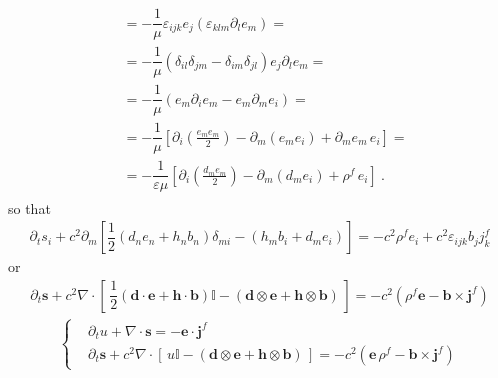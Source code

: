 \documentclass[letterpaper,10pt,italian]{jupyterBook}
\begin{document}
\begin{equation*}
\begin{split}
\begin{aligned}
  & = - \dfrac{1}{\mu} \varepsilon_{ijk} e_j \left( \varepsilon_{klm} \partial_l e_m \right) = \\
  & = - \dfrac{1}{\mu} \left( \delta_{il} \delta_{jm} - \delta_{im} \delta_{jl} \right) e_j \partial_l e_m =  \\
  & = - \dfrac{1}{\mu} \left( e_m \partial_i e_m - e_m \partial_m e_i \right) =  \\
  & = - \dfrac{1}{\mu} \left[ \partial_i \left(\frac{e_m e_m}{2}\right) -  \partial_m \left( e_m e_i \right) + \partial_m e_m \, e_i \right] = \\
  & = - \dfrac{1}{\varepsilon \mu} \left[ \partial_i \left(\frac{d_m e_m}{2}\right) - \partial_m \left( d_m e_i \right) + \rho^f \, e_i \right] \ .
\end{aligned}\end{split}
\end{equation*}
\sphinxAtStartPar
so that
\begin{equation*}
\begin{split}\partial_t s_i + c^2 \partial_m \left[ \dfrac{1}{2}\left( d_n e_n + h_n b_n \right) \delta_{mi} - \left( h_m b_i + d_m e_i \right) \right] = - c^2 \rho^f e_i + c^2 \varepsilon_{ijk} b_j j_k^f \end{split}
\end{equation*}
\sphinxAtStartPar
or
\begin{equation*}
\begin{split}\partial_t \mathbf{s} + c^2 \nabla \cdot \left[ \, \dfrac{1}{2} \left( \mathbf{d} \cdot \mathbf{e} + \mathbf{h} \cdot \mathbf{b} \right) \mathbb{I} - \left( \mathbf{d} \otimes \mathbf{e} + \mathbf{h} \otimes \mathbf{b} \right) \, \right] = - c^2 \left( \rho^f \mathbf{e} - \mathbf{b} \times \mathbf{j}^f \right)\end{split}
\end{equation*}\begin{equation*}
\begin{split}\begin{cases}
& \partial_t u + \nabla \cdot \mathbf{s} = - \mathbf{e} \cdot \mathbf{j}^f \\
& \partial_t \mathbf{s} + c^2 \nabla \cdot \left[ \, u \mathbb{I} - \left( \mathbf{d} \otimes \mathbf{e} + \mathbf{h} \otimes \mathbf{b} \right) \, \right] = - c^2 \left( \mathbf{e} \, \rho^f - \mathbf{b} \times \mathbf{j}^f \right)
\end{cases}\end{split}
\end{equation*}
\sphinxstepscope
\end{document}
